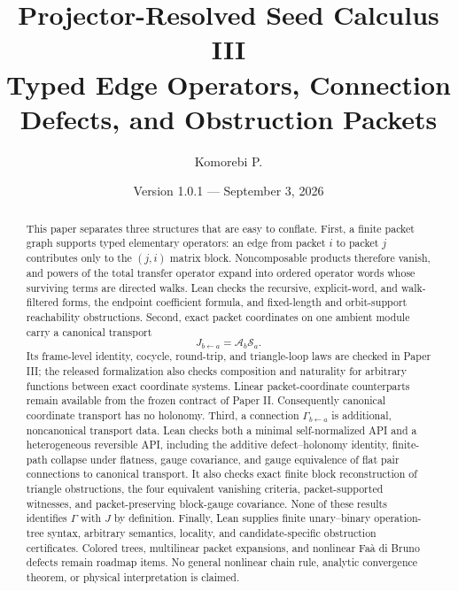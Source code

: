 \documentclass[11pt]{article}
\title{\textbf{Projector-Resolved Seed Calculus III}\\[0.45em]
\large Typed Edge Operators, Connection Defects, and Obstruction Packets}
\author{Komorebi P.}
\date{Version 1.0.1 --- September 3, 2026}
\theoremstyle{definition}
\theoremstyle{remark}
\newcommand{\cA}{\mathcal A}
\newcommand{\cS}{\mathcal S}
\begin{document}
\maketitle

\begin{abstract}
This paper separates three structures that are easy to conflate.
First, a finite packet graph supports typed elementary operators: an edge from
packet $i$ to packet $j$ contributes only to the $(j,i)$ matrix block.
Noncomposable products therefore vanish, and powers of the total transfer
operator expand into ordered operator words whose surviving terms are
directed walks.  Lean checks the recursive, explicit-word, and walk-filtered
forms, the endpoint coefficient formula, and fixed-length and orbit-support
reachability obstructions.
Second, exact packet coordinates on one ambient module carry a canonical
transport
\[
J_{b\leftarrow a}=\cA_b\cS_a.
\]
Its frame-level identity, cocycle, round-trip, and triangle-loop laws are
checked in Paper III; the released formalization also checks composition and
naturality for arbitrary functions between exact coordinate systems.  Linear
packet-coordinate counterparts remain available from the frozen contract of
Paper II.
Consequently canonical coordinate transport has no holonomy.  Third, a
connection $\Gamma_{b\leftarrow a}$ is additional, noncanonical transport
data.  Lean checks both a minimal self-normalized API and a heterogeneous
reversible API, including the additive defect--holonomy identity, finite-path
collapse under flatness, gauge covariance, and gauge equivalence of flat pair
connections to canonical transport.  It also checks exact finite block
reconstruction of triangle obstructions, the four equivalent vanishing
criteria, packet-supported witnesses, and packet-preserving block-gauge
covariance.  None of these results identifies $\Gamma$ with $J$ by definition.
Finally, Lean supplies finite unary--binary operation-tree
syntax, arbitrary semantics, locality, and candidate-specific obstruction
certificates.  Colored trees, multilinear packet expansions, and nonlinear
Fa\`a di Bruno defects remain roadmap items.  No general nonlinear chain rule,
analytic convergence theorem, or physical interpretation is claimed.
\end{abstract}
\end{document}
